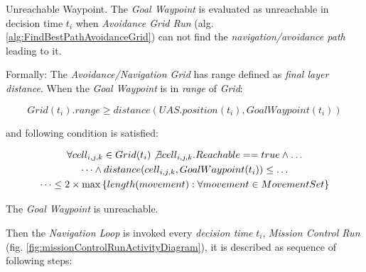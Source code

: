 \begin{definition}{Unreachable Waypoint}\label{def:unreachable Waypoint}. The \emph{Goal Waypoint} is evaluated as unreachable in decision time $t_i$ when \emph{Avoidance Grid Run} (alg. \ref{alg:FindBestPathAvoidanceGrid}) can not find the \emph{navigation/avoidance path} leading to it.

\noindent Formally: The \emph{Avoidance/Navigation Grid} has range defined as \emph{final layer distance}. When the \emph{Goal Waypoint} is in  \emph{range} of \emph{Grid}:

\begin{equation}
    Grid(t_i).range \ge distance(UAS.position(t_i),GoalWaypoint(t_i))
\end{equation}

\noindent and following condition is satisfied:

\begin{multline}\label{eq:unreachableWaypoint}
    \forall cell_{i,j,k}\in Grid(t_i) \not\exists cell_{i,j,k}. Reachable == true \wedge\dots  \\\dots\wedge distance(cell_{i,j,k}, Goal Waypoint(t_i)) \le\dots \\ \dots\le 2 \times \max \left\{length(movement):\forall movement\in MovementSet\right\}
\end{multline}

\noindent The \emph{Goal Waypoint} is unreachable.

\end{definition}

Then the \emph{Navigation Loop} is invoked  every \emph{decision time} $t_i$, \emph{Mission Control Run} (fig. \ref{fig:missionControlRunActivityDiagram}), it is described as sequence of following steps:

